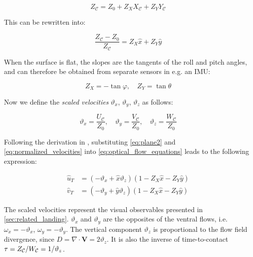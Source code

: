 \begin{equation}
\label{eq:plane}
Z_\mathcal{C} = Z_0 + Z_X X_\mathcal{C} + Z_Y Y_\mathcal{C}
\end{equation}

This can be rewritten into:

\begin{equation}
\label{eq:plane2}
\frac{Z_\mathcal{C}-Z_0}{Z_\mathcal{C}}=Z_X\hat{x}+Z_Y\hat{y}
\end{equation}

When the surface is flat, the slopes are the tangents of the roll and pitch angles, and can therefore be obtained from separate sensors in e.g. an IMU:

\begin{equation}
{Z_X} =  - \tan \varphi ,\quad {Z_Y} = \tan \theta
\end{equation}

Now we define the \emph{scaled velocities} $\vartheta_x$, $\vartheta_y$, $\vartheta_z$ as follows:

\begin{equation}
\label{eq:normalized_velocities}
{\vartheta _x} =  \frac{U_\mathcal{C}}{Z_0},\quad {\vartheta _y} =  \frac{V_\mathcal{C}}{Z_0},\quad {\vartheta _z} =  \frac{W_\mathcal{C}}{Z_0}
\end{equation}

Following the derivation in \citet{DeCroon2013}, substituting \cref{eq:plane2} and \cref{eq:normalized_velocities} into \cref{eq:optical_flow_equations} leads to the following expression:

\begin{equation}
\label{eq:planar_flow_field1}
\begin{aligned}
\hat u_T &= \left( { - {\vartheta _x} + \hat x{\vartheta _z}} \right)\left( {1-Z_X\hat{x}-Z_Y\hat{y}} \right) \\
\hat v_T &= \left( { - {\vartheta _y} + \hat y{\vartheta _z}} \right)\left( {1-Z_X\hat{x}-Z_Y\hat{y}} \right)
\end{aligned}
\end{equation}

The scaled velocities represent the visual observables presented in \cref{sec:related_landing}. $\vartheta_x$ and $\vartheta_y$ are the opposites of the ventral flows, i.e. $\omega_x = -\vartheta_x$, $\omega_y = -\vartheta_y$. The vertical component $\vartheta_z$ is proportional to the flow field divergence, since $D=\nabla\cdot\mathbf{V}=2\vartheta_z$. It is also the inverse of time-to-contact $\tau = Z_{\cal C}/W_{\cal C} = 1/\vartheta_z$.

